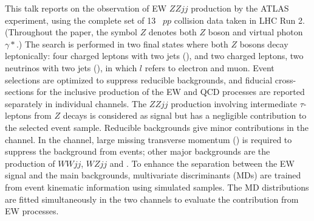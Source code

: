 This talk reports on the observation of EW $ZZjj$ production by the ATLAS experiment, using the complete set of 13 \TeV~$pp$ collision data taken in LHC Run 2. (Throughout the paper, the symbol $Z$ denotes both $Z$ boson and virtual photon $\gamma*$.) The search is performed in two final states where both $Z$ bosons decay leptonically: four charged leptons with two jets (\lllljj), and two charged leptons, two neutrinos with two jets (\llvvjj), in which $l$ refers to electron and muon.
Event selections are optimized to suppress reducible backgrounds, and fiducial cross-sections for the inclusive production of the EW and QCD processes are reported separately in individual channels.
The $ZZjj$ production involving intermediate $\tau$-leptons from $Z$ decays is considered as signal but has a negligible contribution to the selected event sample. Reducible backgrounds give minor contributions in the \lllljj channel.
In the \llvvjj channel, large missing transverse momentum (\met) is required to suppress the background from \Zjet events; other major backgrounds are the production of $WWjj$, $WZjj$ and \ttbar.
To enhance the separation between the EW signal and the main backgrounds, multivariate discriminants (MDs) are trained from event kinematic information using simulated samples.
The MD distributions are fitted simultaneously in the two channels to evaluate the contribution from EW processes.


